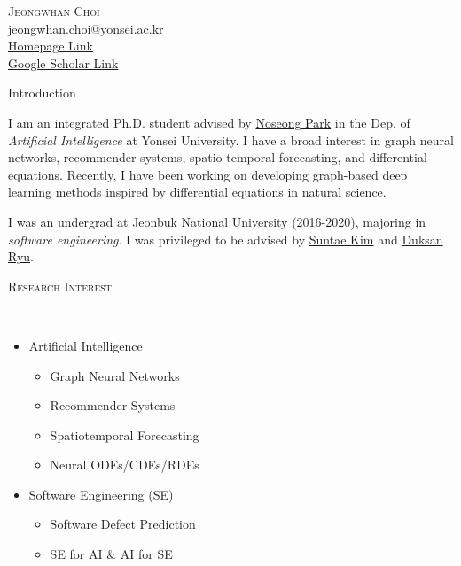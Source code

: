 \documentclass[10pt]{article}
\newenvironment{changemargin}[2]{
  \begin{list}{}{
    \setlength{\topsep}{0pt}
    \setlength{\leftmargin}{#1}
    \setlength{\rightmargin}{#2}
    \setlength{\listparindent}{\parindent}
    \setlength{\itemindent}{\parindent}
    \setlength{\parsep}{\parskip}
  }
  \item[]}{\end{list}
}
\newcommand{\lineover}{
	\begin{changemargin}{-0.05in}{-0.05in}
		\vspace*{-8pt}
		\hrulefill \\
		\vspace*{-2pt}
	\end{changemargin}
}
\newcommand{\header}[1]{
	\begin{changemargin}{-0.5in}{-0.5in}
		\scshape{#1}\\
  	\lineover
	\end{changemargin}
}
\newcommand{\contact}[5]{
	\begin{changemargin}{-0.5in}{-0.5in}
		\begin{center}
			{\Large \scshape {#1}}\\
      {#2} \\  {#3} \\ {#4} \\ {#5}
		\end{center}
	\end{changemargin}
}
\newenvironment{body} {
	\vspace*{-16pt}
	\begin{changemargin}{-0.25in}{-0.5in}
  }
	{\end{changemargin}
}
\begin{document}

\vspace{10pt}

\contact{Jeongwhan Choi}{\href{mailto:email@address.com}{jeongwhan.choi@yonsei.ac.kr}}{\href{https://jeongwhanchoi.me}{Homepage Link}}{\href{https://scholar.google.com/citations?user=3MNElkYAAAAJ&hl=en}{Google Scholar Link}}

\header{Introduction}
\begin{body}
    \vspace{14pt}
 I am an integrated Ph.D. student advised by \href{https://scholar.google.com/citations?user=VSuM3gYAAAAJ&hl=en}{Noseong Park} in the Dep. of \emph{Artificial Intelligence} at Yonsei University. I have a broad interest in graph neural networks, recommender systems, spatio-temporal forecasting, and differential equations. Recently, I have been working on developing graph-based deep learning methods inspired by differential equations in natural science.

I was an undergrad at Jeonbuk National University (2016-2020), majoring in \emph{software engineering}. I was privileged to be advised by \href{https://scholar.google.com/citations?user=IN_HTKEAAAAJ&hl=en}{Suntae Kim} and \href{https://scholar.google.com/citations?user=BHue-MMAAAAJ&hl=en}{Duksan Ryu}.
\end{body}

\medskip

\header{Research Interest}

\begin{body}
    \vspace{14pt}
    \begin{itemize}
        \item Artificial Intelligence
        \begin{itemize}
            \item Graph Neural Networks
            \item Recommender Systems
            \item Spatiotemporal Forecasting
            \item Neural ODEs/CDEs/RDEs
        \end{itemize}
        \item Software Engineering (SE)
        \begin{itemize}
            \item Software Defect Prediction
            \item SE for AI \& AI for SE
        \end{itemize}
    \end{itemize}
\end{body}
\medskip
\end{document}
